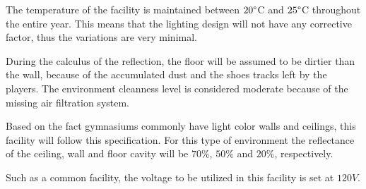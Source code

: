 The temperature of the facility is maintained between $20\degree$C and $25\degree$C throughout the entire year. This means that the lighting design will not have any corrective factor, thus the variations are very minimal.

During the calculus of the reflection, the floor will be assumed to be dirtier than the wall, because of the accumulated dust and the shoes tracks left by the players. The environment cleanness level is considered moderate because of the missing air filtration system.

Based on the fact gymnasiums commonly have light color walls and ceilings, this facility will follow this specification. For this type of environment the reflectance of the ceiling, wall and floor cavity will be $70\%$, $50\%$ and $20\%$, respectively.

Such as a common facility, the voltage to be utilized in this facility is set at $120V$.

